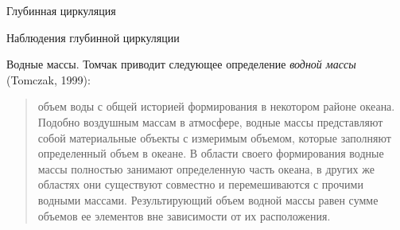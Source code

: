 \begin{chapter}{Глубинная циркуляция}
\begin{section}{Наблюдения глубинной циркуляции}
\begin{paragraph}{Водные массы.}
Томчак приводит следующее определение 
\emph{водной массы} (Tomczak, 1999):
\begin{quote}
объем воды с общей историей формирования в некотором районе океана.
Подобно воздушным массам в атмосфере, водные массы представляют собой 
материальные объекты с измеримым объемом, которые заполняют определенный объем
в океане. В области своего формирования водные массы полностью занимают
определенную часть океана, в других же областях они существуют совместно
и перемешиваются с прочими водными массами. Результирующий объем водной массы
равен сумме объемов ее элементов вне зависимости от их расположения.
\end{quote}
%


\end{paragraph}
\end{section}
\end{chapter}

